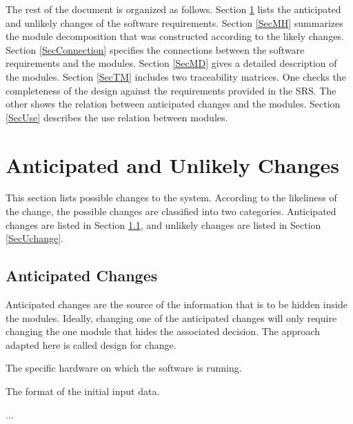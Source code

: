 \documentclass[12pt, titlepage]{article}
\newcounter{acnum}
\newcommand{\actheacnum}{AC\theacnum}
\begin{document}
The rest of the document is organized as follows. Section
\ref{SecChange} lists the anticipated and unlikely changes of the software
requirements. Section \ref{SecMH} summarizes the module decomposition that
was constructed according to the likely changes. Section \ref{SecConnection}
specifies the connections between the software requirements and the
modules. Section \ref{SecMD} gives a detailed description of the
modules. Section \ref{SecTM} includes two traceability matrices. One checks
the completeness of the design against the requirements provided in the SRS. The
other shows the relation between anticipated changes and the modules. Section
\ref{SecUse} describes the use relation between modules.

\section{Anticipated and Unlikely Changes} \label{SecChange}

This section lists possible changes to the system. According to the likeliness
of the change, the possible changes are classified into two
categories. Anticipated changes are listed in Section \ref{SecAchange}, and
unlikely changes are listed in Section \ref{SecUchange}.

\subsection{Anticipated Changes} \label{SecAchange}

Anticipated changes are the source of the information that is to be hidden
inside the modules. Ideally, changing one of the anticipated changes will only
require changing the one module that hides the associated decision. The approach
adapted here is called design for
change.

\begin{description}
  \item[ \actheacnum \label{acHardware}:] The specific
    hardware on which the software is running.
  \item[ \actheacnum \label{acInput}:] The format of the
    initial input data.
  \item ...
\end{description}

\end{document}
